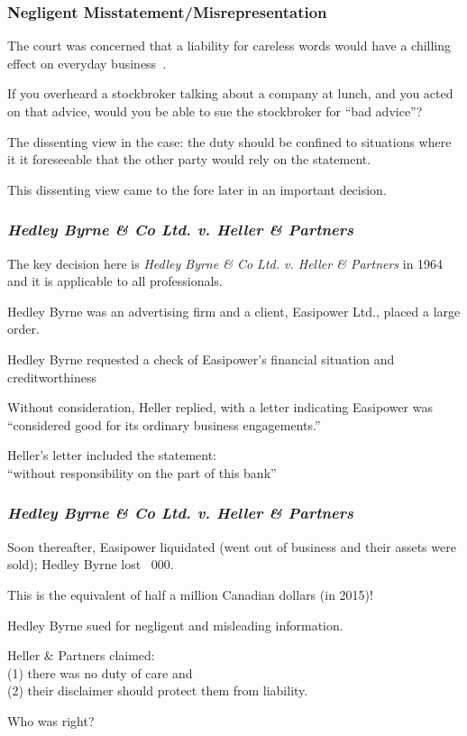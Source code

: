 \begin{frame}
\frametitle{Negligent Misstatement/Misrepresentation}

The court was concerned that a liability for careless words would have a chilling effect on everyday business~\cite{lba}.

If you overheard a stockbroker talking about a company at lunch, and you acted on that advice, would you be able to sue the stockbroker for ``bad advice''?

The dissenting view in the case: the duty should be confined to situations where it it foreseeable that the other party would rely on the statement.

This dissenting view came to the fore later in an important decision.

\end{frame}


\begin{frame}
\frametitle{\textit{Hedley Byrne \& Co Ltd. v. Heller \& Partners}}

The key decision here is \textit{Hedley Byrne \& Co Ltd. v. Heller \& Partners} in 1964 and it is applicable to all professionals.

Hedley Byrne was an advertising firm and a client, Easipower Ltd., placed a large order.

Hedley Byrne requested a check of Easipower's financial situation and creditworthiness

Without consideration, Heller replied, with a letter indicating Easipower was\\
\quad``considered good for its ordinary business engagements.''

Heller's letter included the statement:\\
\quad ``without responsibility on the part of this bank''

\end{frame}



\begin{frame}
\frametitle{\textit{Hedley Byrne \& Co Ltd. v. Heller \& Partners}}

Soon thereafter, Easipower liquidated (went out of business and their assets were sold); Hedley Byrne lost ~000.

This is the equivalent of half a million Canadian dollars (in 2015)!

Hedley Byrne sued for negligent and misleading information.

Heller \& Partners claimed: \\
\quad (1) there was no duty of care and\\
\quad (2) their disclaimer should protect them from liability.

Who was right?

\end{frame}



